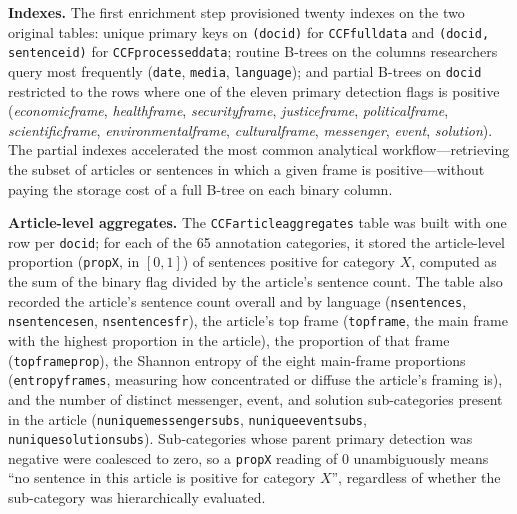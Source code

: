 \documentclass[12pt]{article}
\renewcommand\_{\texttt{\detokenize{_}\allowbreak}}
\begin{document}
{\bfseries{Indexes.}} The first enrichment step provisioned twenty indexes on the two original tables: unique primary keys on \texttt{(doc\_id)} for \texttt{CCF\_full\_data} and \texttt{(doc\_id, sentence\_id)} for \texttt{CCF\_processed\_data}; routine B-trees on the columns researchers query most frequently (\texttt{date}, \texttt{media}, \texttt{language}); and partial B-trees on \texttt{doc\_id} restricted to the rows where one of the eleven primary detection flags is positive (\emph{economic\_frame}, \emph{health\_frame}, \emph{security\_frame}, \emph{justice\_frame}, \emph{political\_frame}, \emph{scientific\_frame}, \emph{environmental\_frame}, \emph{cultural\_frame}, \emph{messenger}, \emph{event}, \emph{solution}). The partial indexes accelerated the most common analytical workflow---retrieving the subset of articles or sentences in which a given frame is positive---without paying the storage cost of a full B-tree on each binary column.

{\bfseries{Article-level aggregates.}} The \texttt{CCF\_article\_aggregates} table was built with one row per \texttt{doc\_id}; for each of the 65 annotation categories, it stored the article-level proportion (\texttt{prop\_X}, in $[0, 1]$) of sentences positive for category $X$, computed as the sum of the binary flag divided by the article's sentence count. The table also recorded the article's sentence count overall and by language (\texttt{n\_sentences}, \texttt{n\_sentences\_en}, \texttt{n\_sentences\_fr}), the article's top frame (\texttt{top\_frame}, the main frame with the highest proportion in the article), the proportion of that frame (\texttt{top\_frame\_prop}), the Shannon entropy of the eight main-frame proportions (\texttt{entropy\_frames}, measuring how concentrated or diffuse the article's framing is), and the number of distinct messenger, event, and solution sub-categories present in the article (\texttt{n\_unique\_messenger\_subs}, \texttt{n\_unique\_event\_subs}, \texttt{n\_unique\_solution\_subs}). Sub-categories whose parent primary detection was negative were coalesced to zero, so a \texttt{prop\_X} reading of 0 unambiguously means \enquote{no sentence in this article is positive for category $X$}, regardless of whether the sub-category was hierarchically evaluated.
\end{document}
